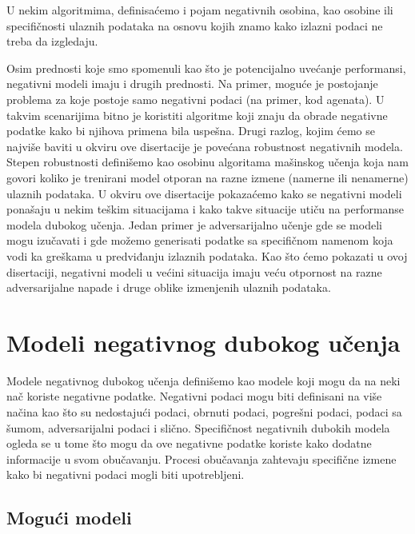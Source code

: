 U nekim algoritmima, definisaćemo i pojam negativnih osobina, kao osobine ili specifičnosti ulaznih podataka na osnovu kojih znamo kako izlazni podaci ne treba da izgledaju.

Osim prednosti koje smo spomenuli kao što je potencijalno uvećanje performansi, negativni modeli imaju i drugih prednosti. Na primer, moguće je postojanje problema za koje postoje samo negativni podaci (na primer, kod agenata). U takvim scenarijima bitno je koristiti algoritme koji znaju da obrade negativne podatke kako bi njihova primena bila uspešna. Drugi razlog, kojim ćemo se najviše baviti u okviru ove disertacije je povećana robustnost negativnih modela. Stepen robustnosti definišemo kao osobinu algoritama mašinskog učenja koja nam govori koliko je trenirani model otporan na razne izmene (namerne ili nenamerne) ulaznih podataka. U okviru ove disertacije pokazaćemo kako se negativni modeli ponašaju u nekim teškim situacijama i kako takve situacije utiču na performanse modela dubokog učenja. Jedan primer je adversarijalno učenje \cite{goodfellow2014generative} gde se modeli mogu izučavati i gde možemo generisati podatke sa specifičnom namenom koja vodi ka greškama u predviđanju izlaznih podataka. Kao što ćemo pokazati u ovoj disertaciji, negativni modeli u većini situacija imaju veću otpornost na razne adversarijalne napade i druge oblike izmenjenih ulaznih podataka.

\section*{Modeli negativnog dubokog učenja}

Modele negativnog dubokog učenja definišemo kao modele koji mogu da na neki nač koriste negativne podatke. Negativni podaci mogu biti definisani na više načina kao što su nedostajući podaci, obrnuti podaci, pogrešni podaci, podaci sa šumom, adversarijalni podaci i slično. Specifičnost negativnih dubokih modela ogleda se u tome što mogu da ove negativne podatke koriste kako dodatne informacije u svom obučavanju. Procesi obučavanja zahtevaju specifične izmene kako bi negativni podaci mogli biti upotrebljeni.

\subsection*{Mogući modeli}

